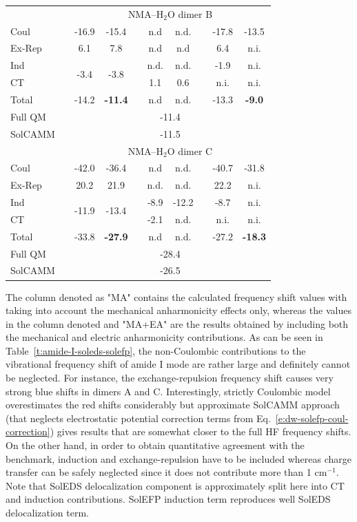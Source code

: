\documentclass[a4paper,titlepage,twoside,fleqn,12pt]{book}
\begin{document}
\begin{refsection}
\begin{table}[t!]
\begin{tabular*}{1.0\textwidth}{@{\extracolsep{\fill} } l ccccccccc }
%
 && \multicolumn{8}{c}{NMA--H$_2$O dimer B} \\
\cline{3-10}
Coul   &&  -16.9 & -15.4 && n.d   &  n.d. && -17.8 & -13.5 \\
Ex-Rep &&   6.1  &   7.8 && n.d   &  n.d  &&  6.4 &  n.i. \\
Ind    &&  \multirow{2}{*}{-3.4} & \multirow{2}{*}{-3.8} && n.d. & n.d. && -1.9 & n.i. \\
CT     &&       &       &&  1.1  &  0.6   &&   n.i.&  n.i. \\
Total  && -14.2 & \bf{-11.4} &&  n.d  &  n.d.  && -13.3 & \bf{-9.0} \\
Full QM&& \multicolumn{8}{c}{-11.4} \\
SolCAMM&& \multicolumn{8}{c}{-11.5} \\
%
 && \multicolumn{8}{c}{NMA--H$_2$O dimer C} \\
\cline{3-10}
Coul   && -42.0 & -36.4 &&   n.d  &  n.d. && -40.7 & -31.8 \\
Ex-Rep &&  20.2 &  21.9 &&   n.d. &  n.d. &&  22.2 &  n.i. \\
Ind    &&  \multirow{2}{*}{-11.9} & \multirow{2}{*}{-13.4} && -8.9 & -12.2 && -8.7 & n.i. \\
CT     &&       &       &&  -2.1  &  n.d. &&  n.i. &  n.i. \\
Total  && -33.8 & \bf{-27.9} &&   n.d  &  n.d. && -27.2 & \bf{-18.3} \\
Full QM&& \multicolumn{8}{c}{-28.4} \\
SolCAMM&& \multicolumn{8}{c}{-26.5} \\
\hline\hline
\end{tabular*}
\end{table}
%
The
column denoted as "MA" contains the calculated frequency
shift values with taking into account the mechanical anharmonicity
effects only, whereas the
values in the column denoted and "MA+EA" are the results obtained
by including both the mechanical and electric anharmonicity
contributions. As can be seen in Table~\ref{t:amide-I-soleds-solefp}, 
the non\hyp{}Coulombic contributions to the vibrational frequency shift
of amide I mode are rather large and definitely cannot be neglected.
For instance, the exchange\hyp{}repulsion frequency shift causes very
strong blue shifts in dimers A and C. Interestingly, strictly Coulombic
model
overestimates the red shifts considerably but approximate SolCAMM approach
(that neglects electrostatic potential correction terms from Eq.~\eqref{e:dw-solefp-coul-correction})
gives results that are somewhat closer to the full HF frequency shifts.
On the other hand, in order to obtain
quantitative agreement with the benchmark, induction and exchange\hyp{}repulsion
have to be included whereas charge transfer can be safely neglected since it does
not contribute more than 1 cm$^{-1}$. Note that SolEDS delocalization component
is approximately split here into CT and induction contributions. SolEFP induction
term reproduces well SolEDS delocalization term.


\end{refsection}
\end{document}

